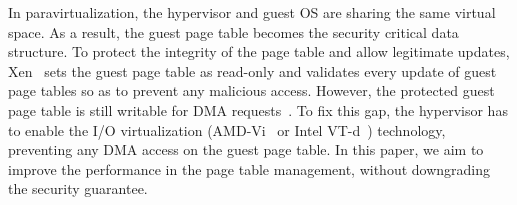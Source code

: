 


In paravirtualization, the hypervisor and guest OS are sharing the same virtual space.
As a result, the guest page table becomes the security critical data structure.
To protect the integrity of the page table and allow legitimate updates, Xen~\cite{barham2003xen} sets the guest page table as read-only and validates every update of guest page tables so as to prevent any malicious access.
However, the protected guest page table is still writable for DMA requests~\cite{disaggregation,adams2006comparison}.
To fix this gap, the hypervisor has to enable the I/O virtualization (AMD-Vi~\cite{amdvt} or Intel VT-d~\cite{intelvt}) technology, preventing any DMA access on the guest page table.
In this paper, we aim to improve the performance in the page table management, without downgrading the security guarantee.

